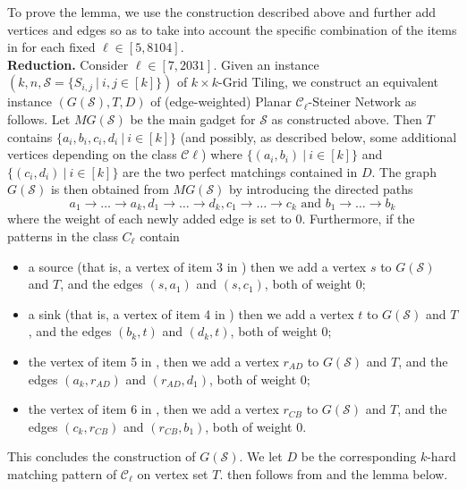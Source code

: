 To prove the lemma, we use the construction described above and further add vertices and edges so as to take into account the specific combination of the items in  for each fixed $\ell \in [5,8104]$.\\

\noindent
\textbf{Reduction.} Consider $\ell \in [7,2031]$. Given an instance $(k,n,\mathcal{S}=\{S_{i,j}~|~i,j \in [k]\})$ of {\sc $k \times k$-Grid Tiling}, we construct an equivalent instance $(G(\mathcal{S}),T,D)$ of (edge-weighted) {\sc Planar $\mathcal{C}_\ell$-Steiner Network} as follows. Let $MG(\mathcal{S})$ be the main gadget for $\mathcal{S}$ as constructed above.
Then $T$ contains $\{a_i,b_i,c_i,d_i~|~i \in [k]\}$ (and possibly, as described below, some additional vertices depending on the class $\mathcal{C}\ell$) where $\{(a_i,b_i)~|~i \in [k]\}$ and $\{(c_i,d_i)~|~i \in [k]\}$ are the two perfect matchings contained in $D$. The graph $G(\mathcal{S})$ is then obtained from $MG(\mathcal{S})$ by introducing the directed paths
\[
a_1 \rightarrow \ldots \rightarrow a_k, d_1 \rightarrow \ldots \rightarrow d_k, c_1 \rightarrow \ldots \rightarrow c_k 
\text{ and } b_1 \rightarrow \ldots \rightarrow b_k
\]
where the weight of each newly added edge is set to 0. Furthermore, if the patterns in the class $C_\ell$ contain
\begin{itemize}
\item a source (that is, a vertex of item 3 in ) then we add a vertex $s$ to $G(\mathcal{S})$ and $T$, and the edges $(s,a_1)$ and $(s,c_1)$, both of weight 0;
\item a sink (that is, a vertex of item 4 in ) then we add a vertex $t$ to $G(\mathcal{S})$ and $T$, and the edges $(b_k,t)$ and $(d_k,t)$, both of weight 0;
\item the vertex of item 5 in , then we add a vertex $r_{AD}$ to $G(\mathcal{S})$ and $T$, and the edges $(a_k,r_{AD})$ and $(r_{AD},d_1)$, both of weight 0;
\item the vertex of item 6 in , then we add a vertex $r_{CB}$ to $G(\mathcal{S})$ and $T$, and the edges $(c_k,r_{CB})$ and $(r_{CB},b_1)$, both of weight 0.
\end{itemize}
This concludes the construction of $G(\mathcal{S})$. We let $D$ be the corresponding $k$-hard matching pattern of $\mathcal{C}_\ell$ on vertex set $T$.  then follows from  and the lemma below.

